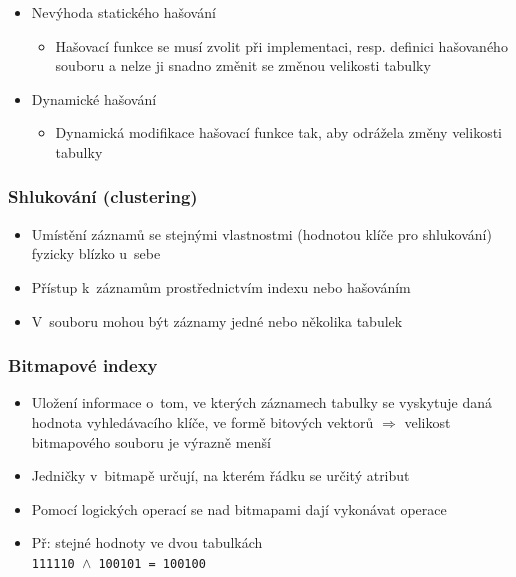 \documentclass[a4paper,10pt]{article}
\newcommand{\tedy}{$\Rightarrow$ }
\begin{document}
\begin{itemize}
          \item Nevýhoda statického hašování
          \begin{itemize}
            \item Hašovací funkce se musí zvolit při implementaci, resp. definici hašovaného souboru a nelze ji snadno změnit se změnou velikosti tabulky
          \end{itemize}

          \item Dynamické hašování
          \begin{itemize}
            \item Dynamická modifikace hašovací funkce tak, aby odrážela změny velikosti tabulky
          \end{itemize}
        \end{itemize}

      \subsubsection{Shlukování (clustering)}
        \begin{itemize}
          \item Umístění záznamů se stejnými vlastnostmi (hodnotou klíče pro shlukování) fyzicky blízko u~sebe
          \item Přístup k~záznamům prostřednictvím indexu nebo hašováním
          \item V~souboru mohou být záznamy jedné nebo několika tabulek
        \end{itemize}
      \subsubsection{Bitmapové indexy}
        \begin{itemize}
          \item Uložení informace o~tom, ve kterých záznamech tabulky se vyskytuje daná hodnota vyhledávacího klíče, ve formě bitových vektorů \tedy velikost bitmapového souboru je výrazně menší
          \item Jedničky v~bitmapě určují, na kterém řádku se určitý atribut
          \item Pomocí logických operací se nad bitmapami dají vykonávat operace
          \item Př: stejné hodnoty ve dvou tabulkách \\
          \texttt{111110 $\land$ 100101 = 100100}
        \end{itemize}
\end{document}

